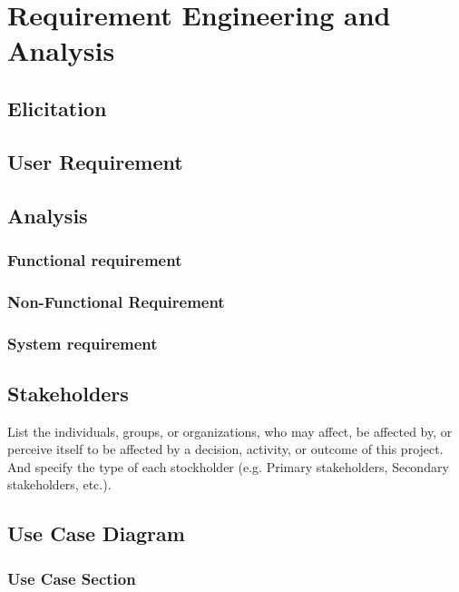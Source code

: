 \chapter{Requirement Engineering and Analysis}

\section{Elicitation}

\section{User Requirement}

\section{Analysis}

\subsection{Functional requirement}

\subsection{Non-Functional Requirement}

\subsection{System requirement}

\section{Stakeholders}

List the individuals, groups, or organizations, who may affect, be affected by, or perceive itself to be affected by a decision, activity, or outcome of this project. And specify the type of each stockholder (e.g. Primary stakeholders, Secondary stakeholders, etc.).

\section{Use Case Diagram}

\subsection{Use Case Section}

